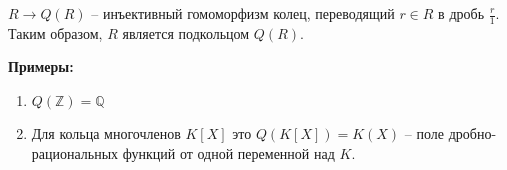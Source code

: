 \begin{notice}
    $R \to Q(R)$ -- инъективный гомоморфизм колец, переводящий $r \in R$ в дробь $\frac{r}{1}$. Таким образом, $R$ является подкольцом $Q(R)$.
\end{notice}

\textbf{Примеры:}
\begin{enumerate}
    \item $Q(\mathbb{Z}) = \mathbb{Q}$
    \item Для кольца многочленов $K[X]$ это $Q(K[X]) = K(X)$ -- поле дробно-рациональных функций от одной переменной над $K$.
\end{enumerate}